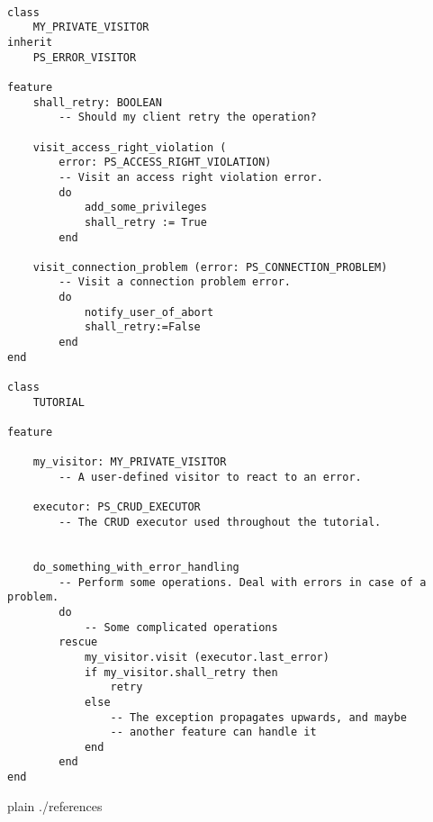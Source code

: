 \documentclass[a4paper,12pt]{report}
\begin{document}
\begin{lstlisting}[language=OOSC2Eiffel, captionpos=b, caption={Sample error handling using a visitor.}, label={lst:error_visitor_example}]

class
	MY_PRIVATE_VISITOR
inherit
	PS_ERROR_VISITOR

feature
	shall_retry: BOOLEAN
		-- Should my client retry the operation?

	visit_access_right_violation (
		error: PS_ACCESS_RIGHT_VIOLATION)
		-- Visit an access right violation error.
		do
			add_some_privileges
			shall_retry := True
		end

	visit_connection_problem (error: PS_CONNECTION_PROBLEM)
		-- Visit a connection problem error.
		do
			notify_user_of_abort
			shall_retry:=False
		end
end

class
	TUTORIAL

feature

	my_visitor: MY_PRIVATE_VISITOR
		-- A user-defined visitor to react to an error.

	executor: PS_CRUD_EXECUTOR
		-- The CRUD executor used throughout the tutorial.


	do_something_with_error_handling
		-- Perform some operations. Deal with errors in case of a problem.
		do
			-- Some complicated operations
		rescue
			my_visitor.visit (executor.last_error)
			if my_visitor.shall_retry then
				retry
			else
				-- The exception propagates upwards, and maybe
				-- another feature can handle it
			end
		end
end

\end{lstlisting}


%

%

\begin{flushleft}
 
{{{
 {plain}
 {./references}
}}}
\end{flushleft}
\end{document}
